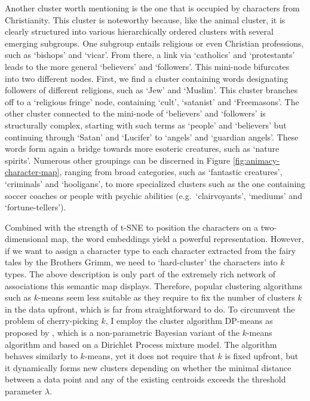 Another cluster worth mentioning is the one that is occupied by characters from Christianity. This cluster is noteworthy because, like the animal cluster, it is clearly structured into various hierarchically ordered clusters with several emerging subgroups. One subgroup entails religious or even Christian professions, such as `bishops' and `vicar'. From there, a link via `catholics' and `protestants' leads to the more general `believers' and `followers'. This mini-node bifurcates into two different nodes. First, we find a cluster containing words designating followers of different religions, such as `Jew' and `Muslim'. This cluster branches off to a `religious fringe' node, containing `cult', `satanist' and `Freemasons'. The other cluster connected to the mini-node of `believers' and `followers' is structurally complex, starting with such terms as `people' and `believers' but continuing through `Satan' and `Lucifer' to `angels' and `guardian angels'. These words form again a bridge towards more esoteric creatures, such as `nature spirits'. Numerous other groupings can be discerned in Figure \ref{fig:animacy-character-map}, ranging from broad categories, such as `fantastic creatures', `criminals' and `hooligans', to more specialized clusters such as the one containing soccer coaches or people with psychic abilities (e.g.\ `clairvoyants', `mediums' and `fortune-tellers'). 

Combined with the strength of t-SNE to position the characters on a two-dimensional map, the word embeddings yield a powerful representation. However, if we want to assign a character type to each character extracted from the fairy tales by the Brothers Grimm, we need to `hard-cluster' the characters into $k$ types. The above description is only part of the extremely rich network of associations this semantic map displays. Therefore, popular clustering algorithms such as $k$-means seem less suitable as they require to fix the number of clusters $k$ in the data upfront, which is far from straightforward to do. To circumvent the problem of cherry-picking $k$, I employ the cluster algorithm DP-means as proposed by \citeauthor{Kulis:2012}, which is a non-parametric Bayesian variant of the $k$-means algorithm and based on a Dirichlet Process mixture model\autocite{Kulis:2012}. The algorithm behaves similarly to $k$-means, yet it does not require that $k$ is fixed upfront, but it dynamically forms new clusters depending on whether the minimal distance between a data point and any of the existing centroids exceeds the threshold parameter $\lambda$. 

